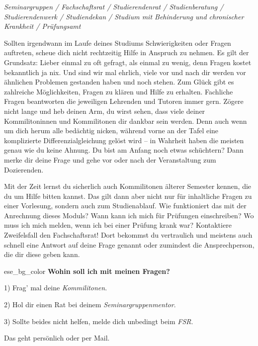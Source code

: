 
\textit{Seminargruppen / Fachschaftsrat / Studierendenrat / Studienberatung / Studierendenwerk / Studiendekan / Studium mit Behinderung und chronischer Krankheit / Prüfungsamt}

Sollten irgendwann im Laufe deines Studiums Schwierigkeiten oder Fragen auftreten, scheue dich nicht rechtzeitig Hilfe in Anspruch zu nehmen.
Es gilt der Grundsatz: Lieber einmal zu oft gefragt, als einmal zu wenig, denn Fragen kostet bekanntlich ja nix. Und sind wir mal ehrlich, viele vor und nach dir werden vor ähnlichen Problemen gestanden haben und noch stehen.
Zum Glück gibt es zahlreiche Möglichkeiten, Fragen zu klären und Hilfe zu erhalten.
Fachliche Fragen beantworten die jeweiligen Lehrenden und Tutoren immer gern. Zögere nicht lange und heb deinen Arm, du wirst sehen, dass viele deiner Kommilitoninnen und Kommilitonen dir dankbar sein werden. Denn auch wenn um dich herum alle bedächtig nicken, während vorne an der Tafel eine komplizierte Differenzialgleichung gelöst wird -- in Wahrheit haben die meisten genau wie du keine Ahnung.
Du bist am Anfang noch etwas schüchtern? Dann merke dir deine Frage und gehe vor oder nach der Veranstaltung zum Dozierenden.

Mit der Zeit lernst du sicherlich auch Kommilitonen älterer Semester kennen, die du um Hilfe bitten kannst.
Das gilt dann aber nicht nur für inhaltliche Fragen zu einer Vorlesung, sondern auch zum Studienablauf.
Wie funktioniert das mit der Anrechnung dieses Moduls? Wann kann ich mich für Prüfungen einschreiben? Wo muss ich mich melden, wenn ich bei einer Prüfung krank war? Kontaktiere Zweifelsfall den Fachschaftsrat!
Dort bekommst du vertraulich und meistens auch schnell eine Antwort auf deine Frage genannt oder zumindest die Ansprechperson, die dir diese geben kann.

\vfill

\begin{awesomeblock}{2pt}{\faLifeRing[regular]}{ese_bg_color}
    \textbf{Wohin soll ich mit meinen Fragen?}

    1) Frag' mal deine \emph{Kommilitonen}.

    2) Hol dir einen Rat bei deinem \emph{Seminargruppenmentor}.

    3) Sollte beides nicht helfen, melde dich unbedingt beim \emph{FSR}.

    Das geht persönlich oder per Mail.
\end{awesomeblock}

